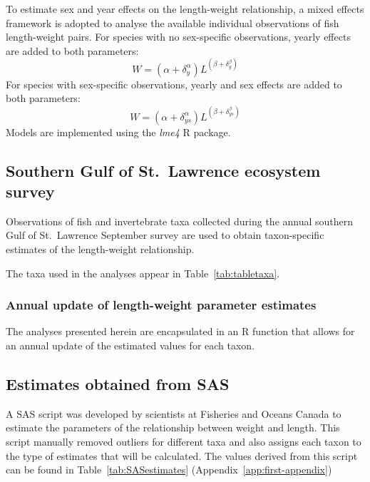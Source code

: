 \documentclass[12pt]{article}\usepackage[]{graphicx}\usepackage[]{color}
\begin{document}
To estimate sex and year effects on the length-weight relationship, a mixed effects framework is adopted to analyse the available individual observations of fish length-weight pairs. For species with no sex-specific observations, yearly effects are added to both parameters:
\begin{equation}
W =  \left(\alpha +\delta^{\alpha}_{y}\right)L^{\left(\beta +\delta^{\beta}_{y} \right)}
\end{equation}
For species with sex-specific observations, yearly and sex effects are added to both parameters:
\begin{equation}
W =  \left(\alpha +\delta^{\alpha}_{ys}\right)L^{\left(\beta +\delta^{\beta}_{ys} \right)}
\end{equation}
Models are implemented using the \emph{lme4} R package.

\subsection{Southern Gulf of St.~Lawrence ecosystem survey}\label{southern-gulf-of-st.-lawrence-ecosystem-survey}

Observations of fish and invertebrate taxa collected during the annual southern Gulf of St.~Lawrence September survey are used to obtain taxon-specific estimates of the length-weight relationship.

The taxa used in the analyses appear in Table~\ref{tab:tabletaxa}.

\subsubsection{Annual update of length-weight parameter estimates}\label{annual-update-of-length-weight-parameter-estimates}

The analyses presented herein are encapsulated in an R function that allows for an annual update of the estimated values for each taxon.

\subsection{Estimates obtained from SAS}\label{estimates-obtained-from-sas}

A SAS script was developed by scientists at Fisheries and Oceans Canada to estimate the parameters of the relationship between weight and length. This script manually removed outliers for different taxa and also assigns each taxon to the type of estimates that will be calculated. The values derived from this script can be found in Table~\ref{tab:SASestimates} (Appendix~\ref{app:first-appendix})
\end{document}
